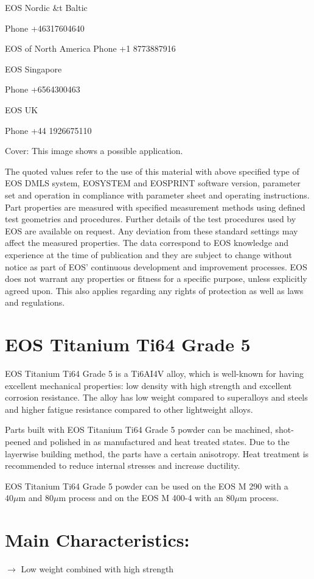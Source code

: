 \documentclass[10pt]{article}
\begin{document}
EOS Nordic \&t Baltic

Phone +46317604640

EOS of North America Phone +1 8773887916

EOS Singapore

Phone +6564300463

EOS UK

Phone +44 1926675110

Cover: This image shows a possible application.

The quoted values refer to the use of this material with above specified type of EOS DMLS system, EOSYSTEM and EOSPRINT software version, parameter set and operation in compliance with parameter sheet and operating instructions. Part properties are measured with specified measurement methods using defined test geometries and procedures. Further details of the test procedures used by EOS are available on request. Any deviation from these standard settings may affect the measured properties. The data correspond to EOS knowledge and experience at the time of publication and they are subject to change without notice as part of EOS' continuous development and improvement processes. EOS does not warrant any properties or fitness for a specific purpose, unless explicitly agreed upon. This also applies regarding any rights of protection as well as laws and regulations.

\section*{EOS Titanium Ti64 Grade 5}
EOS Titanium Ti64 Grade 5 is a Ti6AI4V alloy, which is well-known for having excellent mechanical properties: low density with high strength and excellent corrosion resistance. The alloy has low weight compared to superalloys and steels and higher fatigue resistance compared to other lightweight alloys.

Parts built with EOS Titanium Ti64 Grade 5 powder can be machined, shot-peened and polished in as manufactured and heat treated states. Due to the layerwise building method, the parts have a certain anisotropy. Heat treatment is recommended to reduce internal stresses and increase ductility.

EOS Titanium Ti64 Grade 5 powder can be used on the EOS M 290 with a $40 \mu \mathrm{m}$ and $80 \mu \mathrm{m}$ process and on the EOS M 400-4 with an $80 \mu \mathrm{m}$ process.

\section*{Main Characteristics:}
$\longrightarrow$ Low weight combined with high strength
\end{document}
